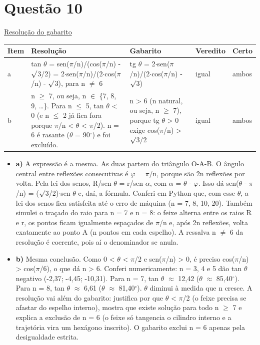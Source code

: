 \documentclass{article}%
\begin{document}
\section*{Questão 10}%
\href{https://poliedroresolve.sistemapoliedro.com.br/vestibulares/ime/2026/ime-2-fase-dia-2-24-10-2025-2-fase-dia-2/dissertativa-10-fisica-2-fase-dia-2-ime-2026}{Resolução do gabarito}\par\smallskip%
\begin{longtable}{@{}p{} p{} p{} p{} p{}@{}}\toprule Item & Resolução & Gabarito & Veredito & Certo \\ \midrule
a & tan $\theta$ = sen($\pi$/n)/(cos($\pi$/n) - $\surd$3/2) = 2$\cdot$sen($\pi$/n)/(2$\cdot$cos($\pi$/n) - $\surd$3), para n $\neq$ 6 & tg $\theta$ = 2$\cdot$sen($\pi$/n)/(2$\cdot$cos($\pi$/n) - $\surd$3) & igual & ambos \\
b & n $\geq$ 7, ou seja, n $\in$ \{7, 8, 9, \ldots{}\}. Para n $\leq$ 5, tan $\theta$ < 0 (e n $\leq$ 2 já fica fora porque $\pi$/n < $\theta$ < $\pi$/2). n = 6 é rasante ($\theta$ = 90$^\circ$) e foi excluído. & n > 6 (n natural, ou seja, n $\geq$ 7), porque tg $\theta$ > 0 exige cos($\pi$/n) > $\surd$3/2 & igual & ambos \\
\bottomrule\end{longtable}%
\begin{itemize}%
\item%
\textbf{a)} A expressão é a mesma. As duas partem do triângulo O{-}A{-}B. O ângulo central entre reflexões consecutivas é $\varphi$ = $\pi$/n, porque são 2n reflexões por volta. Pela lei dos senos, R/sen $\theta$ = r/sen $\alpha$, com $\alpha$ = $\theta$ - $\varphi$. Isso dá sen($\theta$ - $\pi$/n) = ($\surd$3/2)$\cdot$sen $\theta$ e, daí, a fórmula. Conferi em Python que, com esse $\theta$, a lei dos senos fica satisfeita até o erro de máquina (n = 7, 8, 10, 20). Também simulei o traçado do raio para n = 7 e n = 8: o feixe alterna entre os raios R e r, os pontos ficam igualmente espaçados de $\pi$/n e, após 2n reflexões, volta exatamente ao ponto A (n pontos em cada espelho). A ressalva n $\neq$ 6 da resolução é coerente, pois aí o denominador se anula.%
\item%
\textbf{b)} Mesma conclusão. Como 0 < $\theta$ < $\pi$/2 e sen($\pi$/n) > 0, é preciso cos($\pi$/n) > cos($\pi$/6), o que dá n > 6. Conferi numericamente: n = 3, 4 e 5 dão tan $\theta$ negativo (-2,37; -4,45; -10,31). Para n = 7, tan $\theta$ $\approx$ 12,42 ($\theta$ $\approx$ 85,40$^\circ$). Para n = 8, tan $\theta$ $\approx$ 6,61 ($\theta$ $\approx$ 81,40$^\circ$). $\theta$ diminui à medida que n cresce. A resolução vai além do gabarito: justifica por que $\theta$ < $\pi$/2 (o feixe precisa se afastar do espelho interno), mostra que existe solução para todo n $\geq$ 7 e explica a exclusão de n = 6 (o feixe só tangencia o cilindro interno e a trajetória vira um hexágono inscrito). O gabarito exclui n = 6 apenas pela desigualdade estrita.%
\end{itemize}%
\end{document}
